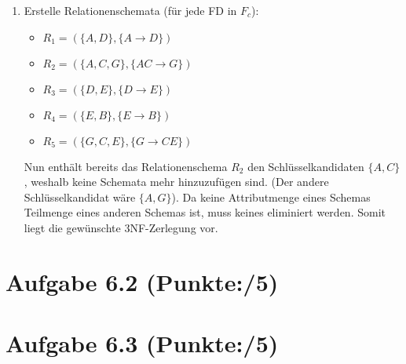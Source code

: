 \documentclass[11pt, a4paper]{article}
\newcommand{\blattnummer}{6}
\newcommand{\pp}{5}
\newcommand{\ppp}{5}
\newcommand{\aufgabe}[2] {\section*{Aufgabe \blattnummer.#1 (Punkte:\qquad/#2)}}
\begin{document}
\begin{enumerate}
\item Erstelle Relationenschemata (für jede FD in $F_c$):
\begin{itemize}
\item $R_1=(\{ A,D\},\{ A \rightarrow D\})$
\item $R_2=(\{ A,C,G\},\{ AC \rightarrow G\})$
\item $R_3=(\{ D,E\},\{ D \rightarrow E\})$
\item $R_4=(\{ E,B\},\{ E \rightarrow B\})$
\item $R_5=(\{ G,C,E\},\{ G \rightarrow CE\})$
\end{itemize}
Nun enthält bereits das Relationenschema $R_2$ den Schlüsselkandidaten $\{ A,C\}$, weshalb keine Schemata mehr hinzuzufügen sind. (Der andere Schlüsselkandidat wäre $\{ A,G\}$).
Da keine Attributmenge eines Schemas Teilmenge eines anderen Schemas ist, muss keines eliminiert werden. Somit liegt die gewünschte 3NF-Zerlegung vor.

\end{enumerate}



\aufgabe{2}{\pp}
\begin{adjustwidth}{20pt}{20pt}

\end{adjustwidth}



\aufgabe{3}{\ppp}
\begin{adjustwidth}{20pt}{20pt}

\end{adjustwidth}


\end{document}
